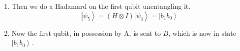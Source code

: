 \documentclass{article}
\newcommand{\ket}[1]{\ensuremath{\left|#1\right\rangle}}
\newcounter{theorem}[section]
\begin{document}
\begin{theorem}
\begin{enumerate}
          \begin{equation} 
            \ket{\psi_4} = \frac{1}{\sqrt{2}} \big( \ket{0 b_0} + (-1)^b \ket{1 b_1} \big) = \bigg( \frac{\ket{0} + (-1)^{b_1} \ket{1}}{\sqrt{2}} \bigg) \ket{b_0} 
          \end{equation}
        \item Then we do a Hadamard on the first qubit unentangling it. 
          \begin{equation} 
            \ket{\psi_5} = (H \otimes I) \ket{\psi_4} = \ket{b_1 b_0} 
          \end{equation}
        \item Now the first qubit, in possession by A, is sent to $B$, which is now in state $\ket{b_1 b_0}$. 
      \end{enumerate}
    \end{theorem}
\end{document}
